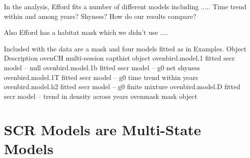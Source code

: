 In the \secr analysis, Efford fits a number of different models
including ..... Time trend within and among years? Shyness?  How do
our results compare?

Also Efford has a habitat mask which we didn't use ....



Included with the data are a mask and four models fitted as in Examples.
Object  Description
ovenCH  multi-session capthist object
ovenbird.model.1  fitted secr model -- null
ovenbird.model.1b  fitted secr model -- g0 net shyness
ovenbird.model.1T  fitted secr model -- g0 time trend within years
ovenbird.model.h2  fitted secr model -- g0 finite mixture
ovenbird.model.D  fitted secr model -- trend in density across years
ovenmask  mask object

\section{SCR Models are Multi-State Models}

